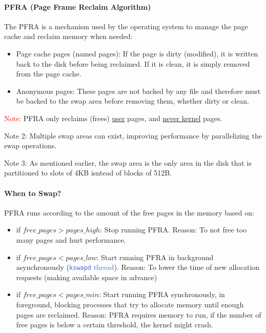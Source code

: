 \documentclass[openany,12pt]{book}
\newcommand{\red}[1]{\textcolor{Red}{#1}}
\newcommand{\blue}[1]{\textcolor{RoyalBlue}{#1}}
\begin{document}
\paragraph{PFRA (Page Frame Reclaim Algorithm)} The PFRA is a mechanism used by the operating system to manage the page cache and reclaim memory when needed:
\begin{itemize}
  \item Page cache pages (named pages): If the page is dirty (modified), it is written back to the disk before being reclaimed. If it is clean, it is simply removed from the page cache.
  \item Anonymous pages: These pages are not backed by any file and therefore must be backed to the swap area before removing them, whether dirty or clean.
\end{itemize}


\red{Note:} PFRA only reclaims (frees) \ul{user} pages, and \ul{never kernel} pages.

Note 2: Multiple swap areas can exist, improving performance by parallelizing the swap operations. 

Note 3: As mentioned earlier, the swap area is the only area in the disk that is partitioned to slots of 4KB isntead of blocks of 512B.


\paragraph{When to Swap?} PFRA runs according to the amount of the free pages in the memory based on:
\begin{itemize}
  \item if \(free\_pages > pages\_high\): Stop running PFRA. Reason: To not free too many pages and hurt performance.

  \item if \(free\_pages < pages\_low\): Start running PFRA in background asynchronously (\blue{\texttt{kswapd} thread}). Reason: To lower the time of new allocation requests (making available space in advance)

  \item if \(free\_pages < pages\_min\): Start running PFRA synchronously, in foreground, blocking processes that try to allocate memory until enough pages are reclaimed. Reason: PFRA requires memory to run, if the number of free pages is below a certain threshold, the kernel might crash.
\end{itemize}
\end{document}

